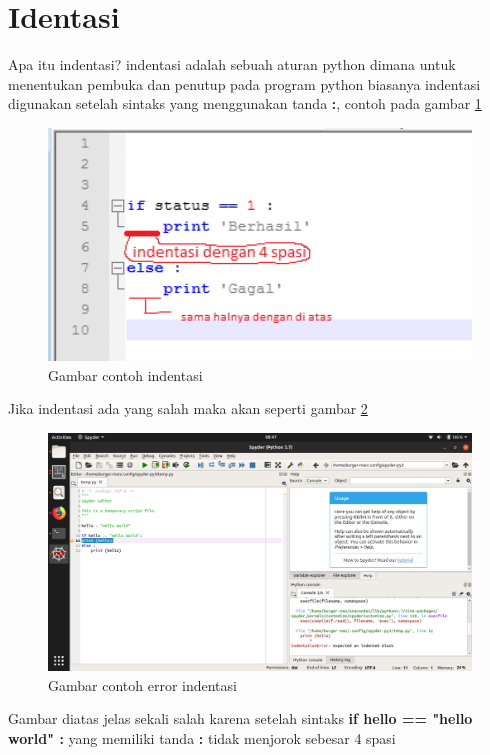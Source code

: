 \section{Identasi}
Apa itu indentasi? indentasi adalah sebuah aturan python dimana untuk menentukan pembuka dan penutup pada program python biasanya indentasi digunakan setelah sintaks yang menggunakan tanda \textbf{:}, contoh pada gambar \ref{indentasi}
\begin{figure}[H]
\centering
\includegraphics[width=1\textwidth]{figures/indentasi.png}
\caption{Gambar contoh indentasi}
\label{indentasi}
\end{figure}

Jika indentasi ada yang salah maka akan seperti gambar \ref{errorindentasi}
\begin{figure}[H]
\centering
\includegraphics[width=1\textwidth]{figures/errorindentasi.png}
\caption{Gambar contoh error indentasi}
\label{errorindentasi}
\end{figure}

Gambar diatas jelas sekali salah karena setelah sintaks \textbf{if hello == "hello world" :} yang memiliki tanda \textbf{:} tidak menjorok sebesar 4 spasi

